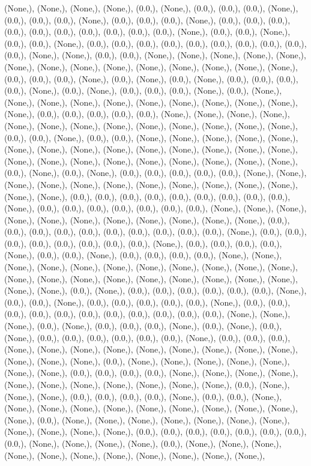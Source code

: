 \documentclass{article}
\begin{document}
(None,), (None,), (None,), (None,), (0.0,), (None,), (0.0,), (0.0,), (0.0,), (None,), (0.0,), (0.0,), (0.0,), (None,), (0.0,), (0.0,), (0.0,), (None,), (0.0,), (0.0,), (0.0,), (0.0,), (0.0,), (0.0,), (0.0,), (0.0,), (0.0,), (0.0,), (None,), (0.0,), (0.0,), (None,), (0.0,), (0.0,), (None,), (0.0,), (0.0,), (0.0,), (0.0,), (0.0,), (0.0,), (0.0,), (0.0,), (0.0,), (0.0,), (None,), (None,), (0.0,), (0.0,), (None,), (None,), (None,), (None,), (None,), (None,), (None,), (None,), (None,), (None,), (None,), (None,), (None,), (None,), (0.0,), (0.0,), (0.0,), (None,), (0.0,), (None,), (0.0,), (None,), (0.0,), (0.0,), (0.0,), (0.0,), (None,), (0.0,), (None,), (0.0,), (0.0,), (0.0,), (None,), (0.0,), (None,), (None,), (None,), (None,), (None,), (None,), (None,), (None,), (None,), (None,), (None,), (0.0,), (0.0,), (0.0,), (0.0,), (0.0,), (None,), (None,), (None,), (None,), (None,), (None,), (None,), (None,), (None,), (None,), (None,), (None,), (None,), (0.0,), (0.0,), (None,), (0.0,), (0.0,), (None,), (None,), (None,), (None,), (None,), (None,), (None,), (None,), (None,), (None,), (None,), (None,), (None,), (None,), (None,), (None,), (None,), (None,), (None,), (None,), (None,), (None,), (None,), (0.0,), (None,), (0.0,), (None,), (0.0,), (0.0,), (0.0,), (0.0,), (0.0,), (None,), (None,), (None,), (None,), (None,), (None,), (None,), (None,), (None,), (None,), (None,), (None,), (None,), (0.0,), (0.0,), (0.0,), (0.0,), (0.0,), (0.0,), (0.0,), (0.0,), (0.0,), (None,), (0.0,), (0.0,), (0.0,), (0.0,), (0.0,), (0.0,), (0.0,), (None,), (None,), (None,), (None,), (None,), (None,), (None,), (None,), (None,), (None,), (None,), (0.0,), (0.0,), (0.0,), (0.0,), (0.0,), (0.0,), (0.0,), (0.0,), (0.0,), (0.0,), (None,), (0.0,), (0.0,), (0.0,), (0.0,), (0.0,), (0.0,), (0.0,), (0.0,), (None,), (0.0,), (0.0,), (0.0,), (0.0,), (None,), (0.0,), (0.0,), (None,), (0.0,), (0.0,), (0.0,), (0.0,), (None,), (None,), (None,), (None,), (None,), (None,), (None,), (None,), (None,), (None,), (None,), (None,), (None,), (None,), (None,), (None,), (None,), (None,), (None,), (None,), (None,), (None,), (0.0,), (None,), (0.0,), (0.0,), (0.0,), (0.0,), (0.0,), (0.0,), (None,), (0.0,), (0.0,), (None,), (0.0,), (0.0,), (0.0,), (0.0,), (0.0,), (None,), (0.0,), (0.0,), (0.0,), (0.0,), (0.0,), (0.0,), (0.0,), (0.0,), (0.0,), (0.0,), (0.0,), (None,), (None,), (None,), (0.0,), (None,), (0.0,), (0.0,), (0.0,), (None,), (0.0,), (None,), (0.0,), (None,), (0.0,), (0.0,), (0.0,), (0.0,), (0.0,), (0.0,), (None,), (0.0,), (0.0,), (0.0,), (None,), (None,), (None,), (None,), (None,), (None,), (None,), (None,), (None,), (None,), (None,), (None,), (0.0,), (None,), (None,), (None,), (None,), (None,), (None,), (None,), (0.0,), (0.0,), (0.0,), (0.0,), (None,), (None,), (None,), (None,), (None,), (None,), (None,), (None,), (None,), (None,), (None,), (0.0,), (None,), (None,), (None,), (0.0,), (0.0,), (0.0,), (0.0,), (None,), (0.0,), (0.0,), (None,), (None,), (None,), (None,), (None,), (None,), (None,), (None,), (None,), (None,), (None,), (0.0,), (None,), (None,), (None,), (None,), (None,), (None,), (None,), (None,), (None,), (None,), (None,), (0.0,), (0.0,), (0.0,), (0.0,), (0.0,), (0.0,), (0.0,), (0.0,), (None,), (None,), (None,), (None,), (0.0,), (None,), (None,), (None,), (None,), (None,), (None,), (None,), (None,), (None,), (None,), (None,), 
\end{document}
